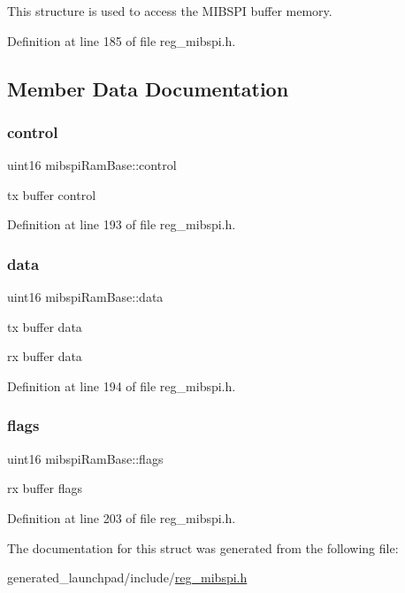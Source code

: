 This structure is used to access the M\+I\+B\+S\+PI buffer memory. 

Definition at line 185 of file reg\+\_\+mibspi.\+h.



\subsection{Member Data Documentation}
\mbox{\label{structmibspiRamBase_ac96ab60a96dcd73e510dde85eb28b90d}} 
\subsubsection{\texorpdfstring{control}{control}}
{\footnotesize\ttfamily uint16 mibspi\+Ram\+Base\+::control}

tx buffer control 

Definition at line 193 of file reg\+\_\+mibspi.\+h.

\mbox{\label{structmibspiRamBase_a1fe10494816123842ffb8fb7ba9cbc42}} 
\subsubsection{\texorpdfstring{data}{data}}
{\footnotesize\ttfamily uint16 mibspi\+Ram\+Base\+::data}

tx buffer data

rx buffer data 

Definition at line 194 of file reg\+\_\+mibspi.\+h.

\mbox{\label{structmibspiRamBase_a510d1c79ffd0312d12bfe0ba70fbfbdc}} 
\subsubsection{\texorpdfstring{flags}{flags}}
{\footnotesize\ttfamily uint16 mibspi\+Ram\+Base\+::flags}

rx buffer flags 

Definition at line 203 of file reg\+\_\+mibspi.\+h.



The documentation for this struct was generated from the following file\+:\begin{DoxyCompactItemize}
\item 
generated\+\_\+launchpad/include/\mbox{\hyperlink{reg__mibspi_8h}{reg\+\_\+mibspi.\+h}}\end{DoxyCompactItemize}
